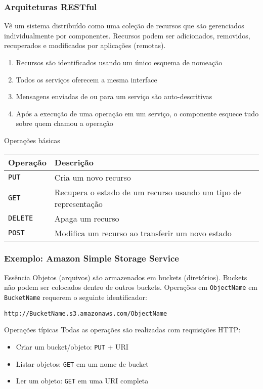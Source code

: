 \documentclass[Ligatures=TeX,table,brazil,svgnames,usetotalslideindicator,compress,10pt]{beamer}
\begin{document}
\begin{frame}
  \frametitle{Arquiteturas RESTful} Vê um sistema distribuído como uma
  coleção de recursos que são gerenciados individualmente por
  componentes. Recursos podem ser adicionados, removidos, recuperados
  e modificados por aplicações (remotas).  \small
    \begin{enumerate}
    \item Recursos são identificados usando um único esquema de nomeação
    \item Todos os serviços oferecem a mesma interface
    \item Mensagens enviadas de ou para um serviço são auto-descritivas
    \item Após a execução de uma operação em um serviço, o componente esquece tudo sobre quem chamou a operação
    \end{enumerate}

  \begin{block}{Operações básicas}
    \begin{table}
      \centering
      \begin{tabular}{l|l}
        \alert{Operação} & \alert{Descrição} \\ \hline
        \texttt{PUT}                 & Cria um novo recurso \\
                         \texttt{GET} & Recupera o estado de um recurso usando um tipo de representação \\
                         \texttt{DELETE}& Apaga um recurso \\
                         \texttt{POST}& Modifica um recurso ao transferir um novo estado
      \end{tabular}
    \end{table}
  \end{block}
\end{frame}

\begin{frame}
  \frametitle{Exemplo: Amazon Simple Storage Service}
  \begin{block}{Essência}
    \alert{Objetos} (arquivos) são armazenados em \alert{buckets} (diretórios). Buckets não podem ser colocados dentro de outros buckets. Operações em \texttt{ObjectName} em \texttt{BucketName} requerem o seguinte identificador:
    \begin{center}
      \texttt{http://BucketName.s3.amazonaws.com/ObjectName}
    \end{center}
  \end{block}

  \begin{exampleblock}{Operações típicas}
    Todas as operações são realizadas com requisições HTTP:
    \begin{itemize}
    \item Criar um bucket/objeto: \texttt{PUT} + URI
    \item Listar objetos: \texttt{GET} em um nome de bucket
    \item Ler um objeto: \texttt{GET} em uma URI completa
    \end{itemize}
  \end{exampleblock}
\end{frame}
\end{document}
